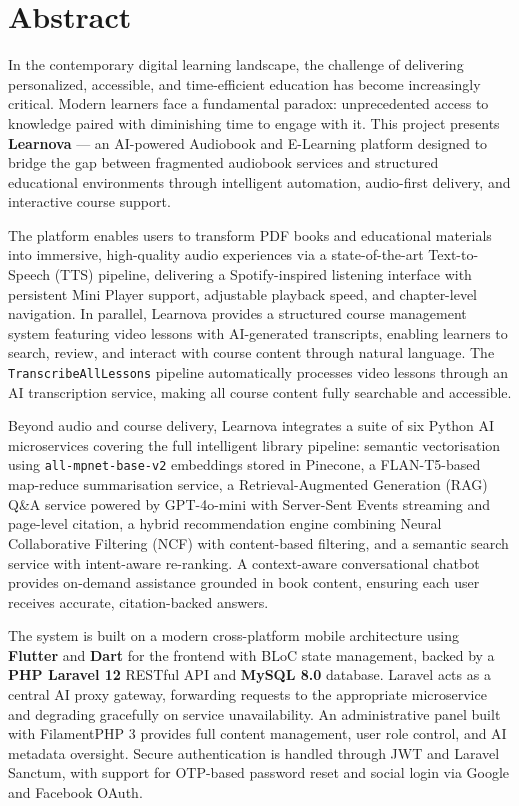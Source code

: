 \chapter*{Abstract}

In the contemporary digital learning landscape, the challenge of delivering
personalized, accessible, and time-efficient education has become increasingly
critical. Modern learners face a fundamental paradox: unprecedented access to
knowledge paired with diminishing time to engage with it. This project presents
\textbf{Learnova} --- an AI-powered Audiobook and E-Learning platform designed
to bridge the gap between fragmented audiobook services and structured
educational environments through intelligent automation, audio-first delivery,
and interactive course support.

The platform enables users to transform PDF books and educational materials into
immersive, high-quality audio experiences via a state-of-the-art Text-to-Speech
(TTS) pipeline, delivering a Spotify-inspired listening interface with persistent
Mini Player support, adjustable playback speed, and chapter-level navigation.
In parallel, Learnova provides a structured course management system featuring
video lessons with AI-generated transcripts, enabling learners to search, review,
and interact with course content through natural language. The
\texttt{TranscribeAllLessons} pipeline automatically processes video lessons
through an AI transcription service, making all course content fully searchable
and accessible.

Beyond audio and course delivery, Learnova integrates a suite of six Python AI
microservices covering the full intelligent library pipeline: semantic
vectorisation using \texttt{all-mpnet-base-v2} embeddings stored in Pinecone,
a FLAN-T5-based map-reduce summarisation service, a Retrieval-Augmented
Generation (RAG) Q\&A service powered by GPT-4o-mini with Server-Sent Events
streaming and page-level citation, a hybrid recommendation engine combining
Neural Collaborative Filtering (NCF) with content-based filtering, and a
semantic search service with intent-aware re-ranking. A context-aware
conversational chatbot provides on-demand assistance grounded in book content,
ensuring each user receives accurate, citation-backed answers.

The system is built on a modern cross-platform mobile architecture using
\textbf{Flutter} and \textbf{Dart} for the frontend with BLoC state management,
backed by a \textbf{PHP Laravel 12} RESTful API and \textbf{MySQL 8.0} database.
Laravel acts as a central AI proxy gateway, forwarding requests to the
appropriate microservice and degrading gracefully on service unavailability.
An administrative panel built with FilamentPHP 3 provides full content
management, user role control, and AI metadata oversight. Secure authentication
is handled through JWT and Laravel Sanctum, with support for OTP-based password
reset and social login via Google and Facebook OAuth.


